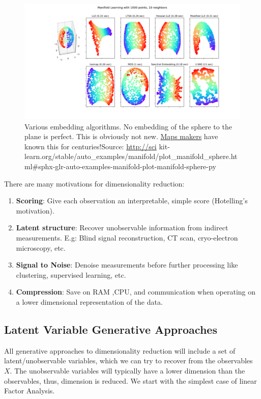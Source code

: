 \documentclass[]{book}
\theoremstyle{definition}
\theoremstyle{definition}
\theoremstyle{definition}
\theoremstyle{remark}
\begin{document}
\begin{figure}
\centering
\includegraphics{art/sphx_glr_plot_manifold_sphere_001.png}
\caption{Various embedding algorithms. No embedding of the sphere to the
plane is perfect. This is obviously not new.
\href{https://en.wikipedia.org/wiki/Map_projection}{Maps makers} have
known this for centuries!Source: \url{http://sci}
kit-learn.org/stable/auto\_examples/manifold/plot\_manifold\_sphere.html\#sphx-glr-auto-examples-manifold-plot-manifold-sphere-py}
\end{figure}

There are many motivations for dimensionality reduction:

\begin{enumerate}
\def\labelenumi{\arabic{enumi}.}
\item
  \textbf{Scoring}: Give each observation an interpretable, simple score
  (Hotelling's motivation).
\item
  \textbf{Latent structure}: Recover unobservable information from
  indirect measurements. E.g: Blind signal reconstruction, CT scan,
  cryo-electron microscopy, etc.
\item
  \textbf{Signal to Noise}: Denoise measurements before further
  processing like clustering, supervised learning, etc.
\item
  \textbf{Compression}: Save on RAM ,CPU, and communication when
  operating on a lower dimensional representation of the data.
\end{enumerate}

\subsection{Latent Variable Generative
Approaches}\label{latent-variable-generative-approaches}

All generative approaches to dimensionality reduction will include a set
of latent/unobservable variables, which we can try to recover from the
observables \(X\). The unobservable variables will typically have a
lower dimension than the observables, thus, dimension is reduced. We
start with the simplest case of linear Factor Analysis.
\end{document}
